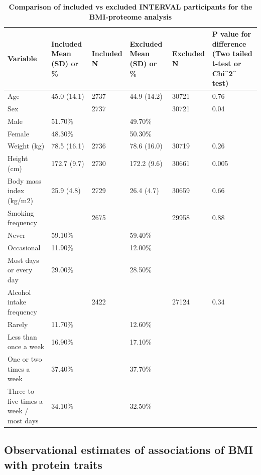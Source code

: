\documentclass[11pt,twoside]{bristolthesis}
\begin{document}
\begin{landscape}\begin{table}

\caption[Comparison of included vs excluded INTERVAL participants for the BMI-proteome analysis]{\label{tab:Inc-excl-part}\textbf{Comparison of included vs excluded INTERVAL participants for the BMI-proteome analysis}}
\centering
\begin{tabu} to 
\toprule
Variable & Included Mean (SD) or \% & Included N & Excluded Mean (SD) or \% & Excluded N & P value for difference (Two tailed t-test or Chi\textasciicircum{}2\textasciicircum{} test)\\
\midrule
Age & 45.0 (14.1) & 2737 & 44.9 (14.2) & 30721 & 0.76\\
Sex &  & 2737 &  & 30721 & 0.04\\
\hspace{1em}Male & 51.70\% &  & 49.70\% &  & \\
\hspace{1em}Female & 48.30\% &  & 50.30\% &  & \\
Weight (kg) & 78.5 (16.1) & 2736 & 78.6 (16.0) & 30719 & 0.26\\
\addlinespace
Height (cm) & 172.7 (9.7) & 2730 & 172.2 (9.6) & 30661 & 0.005\\
Body mass index (kg/m2) & 25.9 (4.8) & 2729 & 26.4 (4.7) & 30659 & 0.66\\
Smoking frequency &  & 2675 &  & 29958 & 0.88\\
\hspace{1em}Never & 59.10\% &  & 59.40\% &  & \\
\hspace{1em}Occasional & 11.90\% &  & 12.00\% &  & \\
\addlinespace
\hspace{1em}Most days or every day & 29.00\% &  & 28.50\% &  & \\
Alcohol intake frequency &  & 2422 &  & 27124 & 0.34\\
\hspace{1em}Rarely & 11.70\% &  & 12.60\% &  & \\
\hspace{1em}Less than once a week & 16.90\% &  & 17.10\% &  & \\
\hspace{1em}One or two times a week & 37.40\% &  & 37.70\% &  & \\
\addlinespace
\hspace{1em}Three to five times a week / most days & 34.10\% &  & 32.50\% &  & \\
\bottomrule
\end{tabu}
\end{table}
\end{landscape}
\hypertarget{observational-estimates-of-associations-of-bmi-with-protein-traits}{%
\subsection{Observational estimates of associations of BMI with protein traits}\label{observational-estimates-of-associations-of-bmi-with-protein-traits}}
\end{document}

